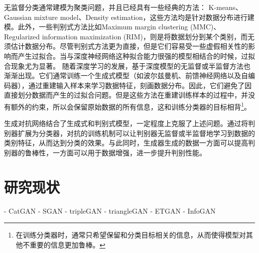 无监督分类通常建模为聚类问题，并且已经具有一些经典的方法：
K-means、Gaussian mixture model、Density estimation，这些方法均是针对数据分布进行建模。此外，一些判别式方法比如Maximum margin clustering (MMC)\cite{xu2005maximum}、Regularized information maximization (RIM)\cite{krause2010discriminative}，则是将数据划分到某个类别，而无须估计数据分布。尽管判别式方法更为直接，但是它们容易受一些虚假相关性的影响而产生过拟合\cite{springenberg2015unsupervised}。当与深度神经网络这种拟合能力很强的模型相结合的时候，过拟合现象尤为显著。
随着深度学习的发展，基于深度模型的无监督或半监督方法也渐渐出现。它们通常训练一个生成式模型（如波尔兹曼机\cite{salakhutdinov2009deep,goodfellow2013multi}、前馈神经网络\cite{bengio2014deep,kingma2014semi}以及自编码器\cite{hinton2006reducing,vincent2008extracting}），通过重建输入样本来学习数据特征，刻画数据分布。因此，它们避免了因直接划分数据而产生的过拟合问题。但是这些方法在重建训练样本的过程中，并没有额外的约束，所以会保留原始数据的所有信息，这和训练分类器的目标相背\footnote{在训练分类器时，通常只希望保留和分类目标相关的信息，从而使得模型对其他不重要的信息更加鲁棒。}。

生成对抗网络结合了生成式和判别式模型，一定程度上克服了上述问题。通过将判别器扩展为分类器，对抗的训练机制可以让判别器无监督或半监督地学习到数据的类别特征，从而达到分类的效果。与此同时，生成器生成的数据一方面可以提高判别器的鲁棒性，一方面可以用于数据增强，进一步提升判别性能。


\section{研究现状}

- CatGAN
- SGAN 
- tripleGAN
- triangleGAN
- ETGAN
- InfoGAN

